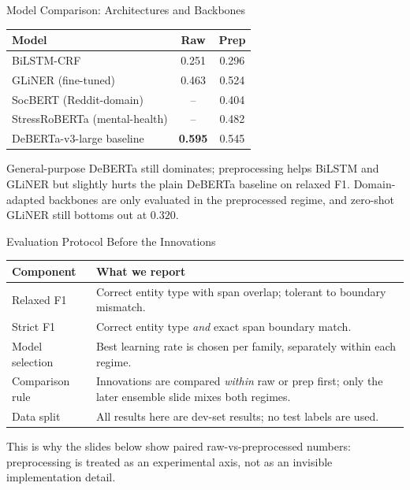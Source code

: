 \documentclass[aspectratio=169,10pt]{beamer}
\begin{document}
\begin{frame}{Model Comparison: Architectures and Backbones}
  \vspace{-1mm}
  \begin{center}\scriptsize
  \begin{tabular}{lcc}
    \toprule
    Model & Raw & Prep \\
    \midrule
    BiLSTM-CRF & 0.251 & 0.296 \\
    GLiNER (fine-tuned) & 0.463 & 0.524 \\
    SocBERT (Reddit-domain) & -- & 0.404 \\
    StressRoBERTa (mental-health) & -- & 0.482 \\
    DeBERTa-v3-large baseline & \textbf{0.595} & 0.545 \\
    \bottomrule
  \end{tabular}
  \end{center}
  \scriptsize General-purpose DeBERTa still dominates; preprocessing helps BiLSTM and GLiNER but slightly hurts the plain DeBERTa baseline on relaxed F1. Domain-adapted backbones are only evaluated in the preprocessed regime, and zero-shot GLiNER still bottoms out at $0.320$.
\end{frame}

\begin{frame}{Evaluation Protocol Before the Innovations}
  \begin{center}\footnotesize
  \begin{tabular}{p{3cm}p{7.6cm}}
    \toprule
    Component & What we report \\
    \midrule
    Relaxed F1 & Correct entity type with span overlap; tolerant to boundary mismatch. \\
    Strict F1 & Correct entity type \emph{and} exact span boundary match. \\
    Model selection & Best learning rate is chosen per family, separately within each regime. \\
    Comparison rule & Innovations are compared \emph{within} raw or prep first; only the later ensemble slide mixes both regimes. \\
    Data split & All results here are dev-set results; no test labels are used. \\
    \bottomrule
  \end{tabular}
  \end{center}
  \vspace{0.3em}

  \footnotesize
  This is why the slides below show paired raw-vs-preprocessed numbers: preprocessing is treated as an experimental axis, not as an invisible implementation detail.
\end{frame}
\end{document}
